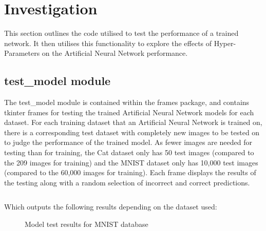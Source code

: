 \documentclass[./project-report/src/latex/project-report.tex]{subfiles}
\begin{document}
\maketitle

\clearpage

\section{Investigation}

This section outlines the code utilised to test the performance of a trained network. It then utilises this functionality to explore the effects of Hyper-Parameters on the 
Artificial Neural Network performance.

\subsection{test\_model module}
\label{sec:test_model-module}

The test\_model module is contained within the frames package, and contains tkinter frames for testing the trained Artificial Neural Network models for each dataset. 
For each training dataset that an Artificial Neural Network is trained on, there is a corresponding test dataset with completely new images to be tested on to judge 
the performance of the trained model. As fewer images are needed for testing than for training, the Cat dataset only has 50 test images (compared to the 209 images 
for training) and the MNIST dataset only has 10,000 test images (compared to the 60,000 images for training).
Each frame displays the results of the testing along with a random selection of incorrect and correct predictions.

\inputminted{python}{./school_project/frames/test_model.py}

Which outputs the following results depending on the dataset used:

\pagebreak

\begin{figure}[h!]
\centering
{}
\caption{Model test results for MNIST database}
\label{fig:test-frame-impl}
\end{figure}
\end{document}
